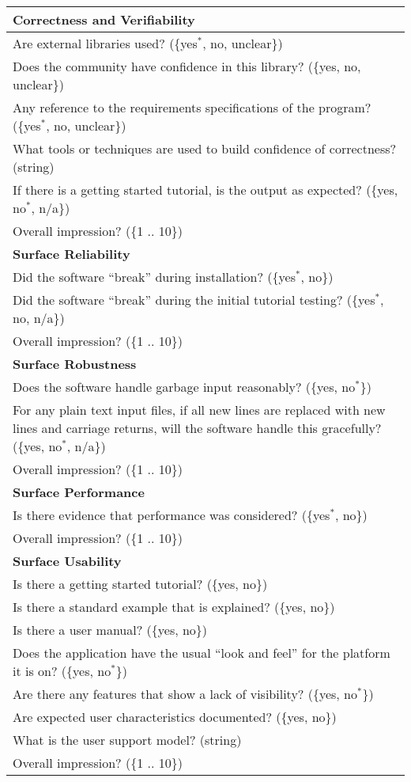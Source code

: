 \begin{longtable}{p{16cm}}
  \midrule
  \textbf{Correctness and Verifiability}\\
  \midrule

  Are external libraries used? (\{yes$^*$, no, unclear\})\\
  Does the community have confidence in this library? (\{yes, no, unclear\})\\
  Any reference to the requirements specifications of the program?
  (\{yes$^*$, no, unclear\})\\
  What tools or techniques are used to build confidence of correctness? (string)\\
  If there is a getting started tutorial, is the output as expected? (\{yes, no$^*$, n/a\})\\
  Overall impression? (\{1 .. 10\})\\

  \midrule
  \textbf{Surface Reliability}\\
  \midrule

  Did the software ``break'' during installation? (\{yes$^*$, no\})\\
  Did the software ``break'' during the initial tutorial testing? (\{yes$^*$, no, n/a\})\\
  Overall impression? (\{1 .. 10\})\\

  \midrule
  \textbf{Surface Robustness}\\
  \midrule

  Does the software handle garbage input reasonably? (\{yes, no$^*$\})\\
  For any plain text input files, if all new lines are replaced with new lines
  and carriage returns, will the software handle this gracefully? (\{yes,
  no$^*$, n/a\})\\
  Overall impression? (\{1 .. 10\})\\

  \midrule
  \textbf{Surface Performance}\\
  \midrule

  Is there evidence that performance was considered? (\{yes$^*$, no\})\\
  Overall impression? (\{1 .. 10\})\\

  \midrule
  \textbf{Surface Usability}\\
  \midrule

  Is there a getting started tutorial? (\{yes, no\})\\
  Is there a standard example that is explained? (\{yes, no\})\\
  Is there a user manual? (\{yes, no\})\\
  Does the application have the usual ``look and feel'' for the platform it is
  on? (\{yes, no$^*$\})\\
  Are there any features that show a lack of visibility? (\{yes, no$^*$\})\\
  Are expected user characteristics documented? (\{yes, no\})\\
  What is the user support model? (string)\\
  Overall impression? (\{1 .. 10\})\\


\end{longtable}
